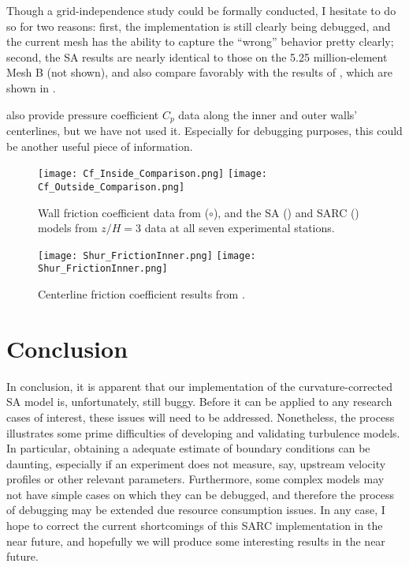 \documentclass[11pt]{article}
\begin{document}
Though a grid-independence study could be formally conducted, I hesitate to do so for two reasons: first, the implementation is still clearly being debugged, and the current mesh has the ability to capture the ``wrong'' behavior pretty clearly; second, the SA results are nearly identical to those on the 5.25 million-element Mesh B (not shown), and also compare favorably with the results of \citep{shur2000}, which are shown in .

\citet{kim1994} also provide pressure coefficient $C_p$ data along the inner and outer walls' centerlines, but we have not used it. Especially for debugging purposes, this could be another useful piece of information.

\begin{figure}[h!]
\centering
\texttt{[image: Cf\_Inside\_Comparison.png]}
\texttt{[image: Cf\_Outside\_Comparison.png]}
\caption{Wall friction coefficient data from \citet{kim1994} ($\circ$), and the SA ({\color{blue}\solidrule[6mm]}) and SARC ({\color{red}\dashrule}) models from $z/H=3$ data at all seven experimental stations.}
\label{fig:Cf_Centerlines}
\end{figure}

\begin{figure}[h!]
\centering
\texttt{[image: Shur\_FrictionInner.png]}
\texttt{[image: Shur\_FrictionInner.png]}
\caption{Centerline friction coefficient results from \citet{shur2000}.}
\label{fig:Shur_Results}
\end{figure}

\section{Conclusion}

In conclusion, it is apparent that our implementation of the curvature-corrected SA model is, unfortunately, still buggy. Before it can be applied to any research cases of interest, these issues will need to be addressed. Nonetheless, the process illustrates some prime difficulties of developing and validating turbulence models. In particular, obtaining a adequate estimate of boundary conditions can be daunting, especially if an experiment does not measure, say, upstream velocity profiles or other relevant parameters. Furthermore, some complex models may not have simple cases on which they can be debugged, and therefore the process of debugging may be extended due resource consumption issues. In any case, I hope to correct the current shortcomings of this SARC implementation in the near future, and hopefully we will produce some interesting results in the near future.





\end{document}
